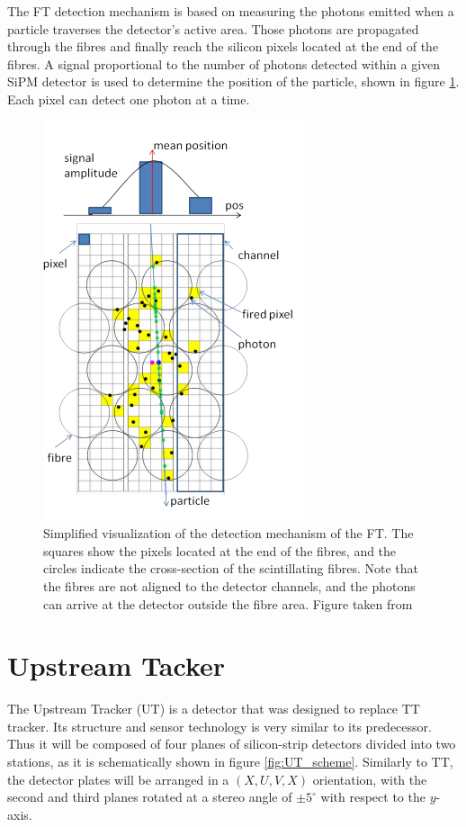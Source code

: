 The FT detection mechanism is based on measuring the photons emitted when a particle traverses the detector's active area. Those photons are propagated through the fibres and finally reach the silicon pixels located at the end of the fibres. A signal proportional to the number of photons detected within a given SiPM detector is used to determine the position of the particle, shown in figure \ref{fig:SciFI_idea}. Each pixel can detect one photon at a time.


\begin{figure}[!h]
\centering
\includegraphics[scale=0.5]{figures/SciFi_idea.PNG}
\caption{Simplified visualization of the detection mechanism of the FT. The squares show the pixels located at the end of the fibres, and the circles indicate the cross-section of the scintillating fibres. Note that the fibres are not aligned to the detector channels, and the photons can arrive at the detector outside the fibre area.  Figure taken from \cite{upgrade_tracker_tdr}
\label{fig:SciFI_idea}}
\end{figure}

 
 \section{Upstream Tacker}
 \label{sec:UT}
The Upstream Tracker (UT) is a detector that was designed to replace TT tracker. Its structure and sensor technology is very similar to its predecessor. Thus it will be composed of four planes of silicon-strip detectors divided into two stations, as it is schematically shown in figure \ref{fig:UT_scheme}. Similarly to TT, the detector plates will be arranged in a $(X, U, V, X)$ orientation, with the second and third planes rotated at a stereo angle of $\pm5^{\circ}$ with respect to the $y$-axis.   

